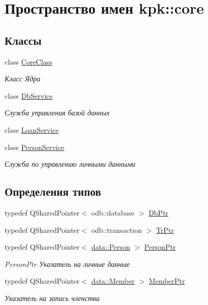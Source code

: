 \hypertarget{namespacekpk_1_1core}{}\section{Пространство имен kpk\+:\+:core}
\label{namespacekpk_1_1core}
\subsection*{Классы}
\begin{DoxyCompactItemize}
\item 
class \hyperlink{classkpk_1_1core_1_1_core_class}{Core\+Class}
\begin{DoxyCompactList}\small\item\em Класс Ядра \end{DoxyCompactList}\item 
class \hyperlink{classkpk_1_1core_1_1_db_service}{Db\+Service}
\begin{DoxyCompactList}\small\item\em Служба управления базой данных \end{DoxyCompactList}\item 
class \hyperlink{classkpk_1_1core_1_1_loan_service}{Loan\+Service}
\item 
class \hyperlink{classkpk_1_1core_1_1_person_service}{Person\+Service}
\begin{DoxyCompactList}\small\item\em Служба по управлению личными данными \end{DoxyCompactList}\end{DoxyCompactItemize}
\subsection*{Определения типов}
\begin{DoxyCompactItemize}
\item 
typedef Q\+Shared\+Pointer$<$ odb\+::database $>$ \hyperlink{namespacekpk_1_1core_a57462cfcc109ed2afcc118d0668710cf}{Db\+Ptr}
\item 
typedef Q\+Shared\+Pointer$<$ odb\+::transaction $>$ \hyperlink{namespacekpk_1_1core_a3bd2bbeaff3894d4ee696d6fae548f3f}{Tr\+Ptr}
\item 
typedef Q\+Shared\+Pointer$<$ \hyperlink{classkpk_1_1data_1_1_person}{data\+::\+Person} $>$ \hyperlink{namespacekpk_1_1core_a4a1c110098ffdfb42bdcba45c4d9a7fe}{Person\+Ptr}
\begin{DoxyCompactList}\small\item\em Person\+Ptr Указатель на личные данные \end{DoxyCompactList}\item 
typedef Q\+Shared\+Pointer$<$ \hyperlink{classkpk_1_1data_1_1_member}{data\+::\+Member} $>$ \hyperlink{namespacekpk_1_1core_aca962f7fa9cb72f79643863d3634f7b9}{Member\+Ptr}
\begin{DoxyCompactList}\small\item\em Указатель на запись членства \end{DoxyCompactList}\end{DoxyCompactItemize}


